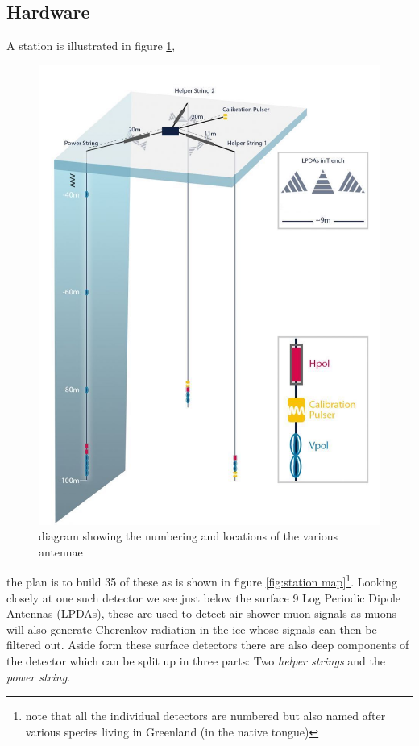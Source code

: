 \subsection{Hardware}
A station is illustrated in figure \ref{fig:detector}, 
\begin{figure}
	\centering
	\includegraphics[height=0.4\textheight]{figures/RNO-G_station_sketch.jpg}	
	\caption{diagram showing the numbering and locations of the various antennae}
	\label{fig:detector}
\end{figure}
the plan is to build 35 of these as is shown in figure \ref{fig:station map}\footnote{note
that all the individual detectors are numbered but also named after various species living in
Greenland (in the native tongue)}. 
Looking closely at one such detector we see
just below the surface 9 Log Periodic Dipole Antennas (LPDAs), these are used
to detect air shower muon signals as muons will also generate Cherenkov
radiation in the ice whose signals can then be filtered out.  Aside form these
surface detectors there are also deep components of the detector which can be
split up in three parts: Two \textit{helper strings} and the \textit{power
string}.

